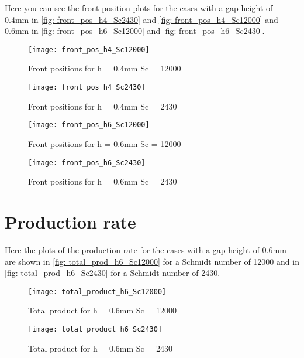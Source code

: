 \documentclass[../thesis.tex]{subfiles}
\begin{document}
Here you can see the front position plots for the cases with a gap height of 0.4mm in \autoref{fig: front_pos_h4_Sc2430} and \autoref{fig: front_pos_h4_Sc12000} and 0.6mm in \autoref{fig: front_pos_h6_Sc12000} and \autoref{fig: front_pos_h6_Sc2430}.
\begin{figure}[htbp]
	\centering
	\texttt{[image: front\_pos\_h4\_Sc12000]}
	\caption{Front positions for h = 0.4mm Sc = 12000
	\label{fig: front_pos_h4_Sc12000}}
\end{figure}
\begin{figure}[htbp]
	\centering
	\texttt{[image: front\_pos\_h4\_Sc2430]}
	\caption{Front positions for h = 0.4mm Sc = 2430
	\label{fig: front_pos_h4_Sc2430}}
\end{figure}
\begin{figure}[htbp]
	\centering
	\texttt{[image: front\_pos\_h6\_Sc12000]}
	\caption{Front positions for h = 0.6mm Sc = 12000
	\label{fig: front_pos_h6_Sc12000}}
\end{figure}
\begin{figure}[htb]
	\centering
	\texttt{[image: front\_pos\_h6\_Sc2430]}
	\caption{Front positions for h = 0.6mm Sc = 2430
	\label{fig: front_pos_h6_Sc2430}}
\end{figure}
\section{Production rate}
\label{sec: app_prodrate}
Here the plots of the production rate for the cases with a gap height of 0.6mm are shown in \autoref{fig: total_prod_h6_Sc12000} for a Schmidt number of 12000 and in \autoref{fig: total_prod_h6_Sc2430} for a Schmidt number of 2430.
\begin{figure}[htb]
	\centering
	\texttt{[image: total\_product\_h6\_Sc12000]}
	\caption{Total product for  h = 0.6mm Sc = 12000
	\label{fig: total_prod_h6_Sc12000}}
\end{figure}
\begin{figure}[htb]
	\centering
	\texttt{[image: total\_product\_h6\_Sc2430]}
	\caption{Total product for  h = 0.6mm Sc = 2430
	\label{fig: total_prod_h6_Sc2430}}
\end{figure}
\end{document}
